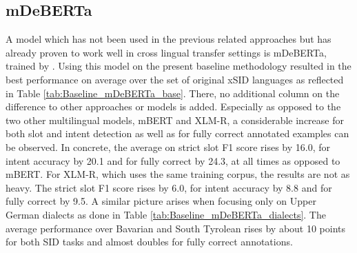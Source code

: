 \documentclass[11pt,a4paper,twoside,openright]{scrbook}
\begin{document}
\begin{table}[!ht]
\caption{Baseline results for XLM-R according to Upper German dialects over three random seeds, Avg. = average on languages without English, German and Swiss German, Diff. = average performance difference to mDeBERTa, sd = standard deviation}
\label{tab:Baseline_XLM-R_dialects}
\end{table}






\subsection{mDeBERTa}

A model which has not been used in the previous related approaches but has already proven to work well in cross lingual transfer settings \citep{artemova-etal-2024-exploring} is mDeBERTa, trained by \citet{he2021deberta, he2021debertav3}. Using this model on the present baseline methodology resulted in the best performance on average over the set of original xSID languages as reflected in Table \ref{tab:Baseline_mDeBERTa_base}. There, no additional column on the difference to other approaches or models is added. Especially as opposed to the two other multilingual models, mBERT and XLM-R, a considerable increase for both slot and intent detection as well as for fully correct annotated examples can be observed. In concrete, the average on strict slot F1 score rises by 16.0, for intent accuracy by 20.1 and for fully correct by 24.3, at all times as opposed to mBERT. For XLM-R, which uses the same training corpus, the results are not as heavy. The strict slot F1 score rises by 6.0, for intent accuracy by 8.8 and for fully correct by 9.5. A similar picture arises when focusing only on Upper German dialects as done in Table \ref{tab:Baseline_mDeBERTa_dialects}. The average performance over Bavarian and South Tyrolean rises by about 10 points for both SID tasks and almost doubles for fully correct annotations. 
\end{document}
